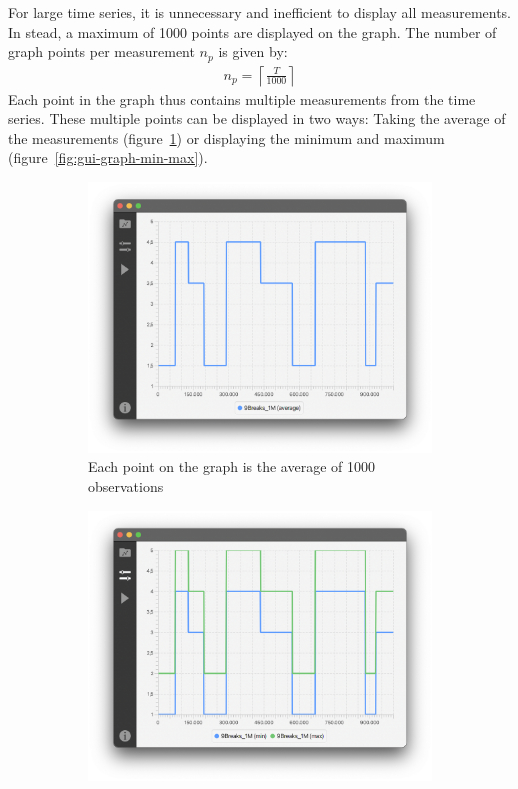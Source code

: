 For large time series, it is unnecessary and inefficient to display all
measurements. In stead, a maximum of 1000 points are displayed on the graph. The number of
graph points per measurement $n_p$ is given by:
\begin{align}
    n_p = \left\lceil \frac{T}{1000} \right\rceil
\end{align}
Each point in the graph thus contains multiple measurements from the time
series. These multiple points can be displayed in two ways: Taking the average
of the measurements (figure~\ref{fig:gui-graph-avg}) or displaying the minimum
and maximum (figure~\ref{fig:gui-graph-min-max}). 

\begin{figure}[h]
    \centering
    \begin{subfigure}[b]{.48\textwidth}
        \centering
        \includegraphics[width=\textwidth]{fig/gui-graph-avg.png}
        \caption{Each point on the graph is the average of 1000 observations}
        \label{fig:gui-graph-avg}
    \end{subfigure}
    \hfill
    \begin{subfigure}[b]{.48\textwidth}
        \centering
        \includegraphics[width=\textwidth]{fig/gui-graph-min-max.png}

\end{subfigure}
\end{figure}
